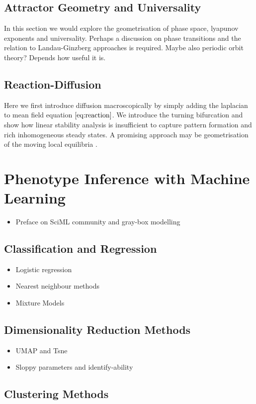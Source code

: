 \subsection{Attractor Geometry and Universality}
In this section we would explore the geometrisation of phase space, lyapunov
exponents and universality. Perhaps a discussion on phase transitions and
the relation to Landau-Ginzberg approaches is required.
Maybe also periodic orbit theory? Depends how useful it is.
\subsection{Reaction-Diffusion}
Here we first introduce diffusion macroscopically by simply adding the laplacian
to mean field equation $\eqref{eq:reaction}$. We introduce the turning bifurcation and
show how linear stability analysis is insufficient to capture pattern formation
and rich inhomogeneous steady states. A promising approach may be geometrisation
of the moving local equilibria \cite{Halatek2018}.

\section{Phenotype Inference with Machine Learning}
\begin{itemize}
    \item Preface on SciML community and gray-box modelling
\end{itemize}

\subsection{Classification and Regression}
\begin{itemize}
    \item Logistic regression
    \item Nearest neighbour methods
    \item Mixture Models
\end{itemize}

\subsection{Dimensionality Reduction Methods}
\begin{itemize}
    \item UMAP and Tsne
    \item Sloppy parameters and identify-ability
\end{itemize}

\subsection{Clustering Methods}
